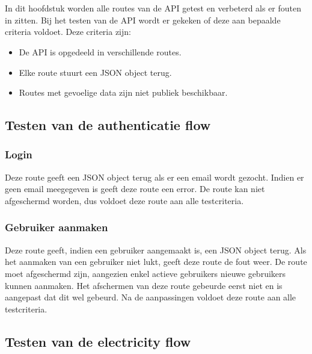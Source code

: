 \chapter{}%
\label{ch:testresultaten}

In dit hoofdstuk worden alle routes van de API getest en verbeterd als er fouten in zitten. Bij het testen van de API wordt er gekeken of deze aan bepaalde criteria voldoet. Deze criteria zijn:

\begin{itemize}
    \item De API is opgedeeld in verschillende routes.
    \item Elke route stuurt een JSON object terug.
    \item Routes met gevoelige data zijn niet publiek beschikbaar.
\end{itemize}

\section{Testen van de authenticatie flow}
\label{sec:testresultaten-authenticatie}

\subsection{Login}
\label{subsec:testresultaten-login}

Deze route geeft een JSON object terug als er een email wordt gezocht. Indien er geen email meegegeven is geeft deze route een error. De route kan niet afgeschermd worden, dus voldoet deze route aan alle testcriteria.

\subsection{Gebruiker aanmaken}
\label{subsec:testresultaten-gebruiker-aanmaken}

Deze route geeft, indien een gebruiker aangemaakt is, een JSON object terug. Als het aanmaken van een gebruiker niet lukt, geeft deze route de fout weer. De route moet afgeschermd zijn, aangezien enkel actieve gebruikers nieuwe gebruikers kunnen aanmaken. Het afschermen van deze route gebeurde eerst niet en is aangepast dat dit wel gebeurd. Na de aanpassingen voldoet deze route aan alle testcriteria.

\section{Testen van de electricity flow}
\label{sec:testresultaten-electricity}


